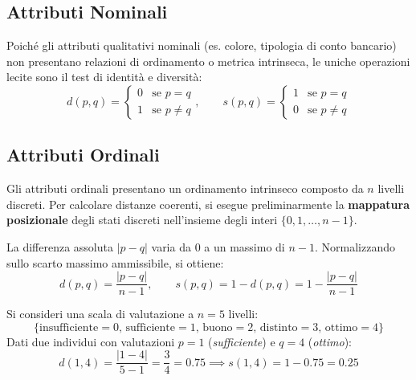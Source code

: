 \subsection{Attributi Nominali}
Poiché gli attributi qualitativi nominali (es. colore, tipologia di conto bancario) non presentano relazioni di ordinamento o metrica intrinseca, le uniche operazioni lecite sono il test di identità e diversità:
\begin{equation}
    d(p, q) = \begin{cases} 0 & \text{se } p = q \\ 1 & \text{se } p \neq q \end{cases}, \qquad
    s(p, q) = \begin{cases} 1 & \text{se } p = q \\ 0 & \text{se } p \neq q \end{cases}
\end{equation}

\subsection{Attributi Ordinali}
Gli attributi ordinali presentano un ordinamento intrinseco composto da $n$ livelli discreti. Per calcolare distanze coerenti, si esegue preliminarmente la \textbf{mappatura posizionale} degli stati discreti nell'insieme degli interi $\{0, 1, \dots, n-1\}$.

La differenza assoluta $|p - q|$ varia da $0$ a un massimo di $n-1$. Normalizzando sullo scarto massimo ammissibile, si ottiene:
\begin{equation}
    d(p, q) = \frac{|p - q|}{n - 1}, \qquad s(p, q) = 1 - d(p, q) = 1 - \frac{|p - q|}{n - 1}
\end{equation}

\begin{example}
Si consideri una scala di valutazione a $n = 5$ livelli:
\begin{equation}
    \{\text{insufficiente} = 0,\, \text{sufficiente} = 1,\, \text{buono} = 2,\, \text{distinto} = 3,\, \text{ottimo} = 4\}
\end{equation}
Dati due individui con valutazioni $p = 1$ (\textit{sufficiente}) e $q = 4$ (\textit{ottimo}):
\begin{equation}
    d(1, 4) = \frac{|1 - 4|}{5 - 1} = \frac{3}{4} = 0.75 \implies s(1, 4) = 1 - 0.75 = 0.25
\end{equation}
\end{example}


